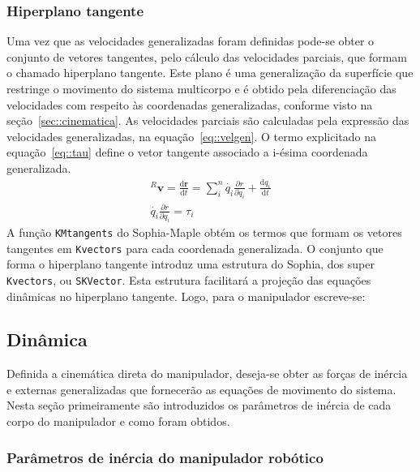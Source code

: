 \subsubsection{Hiperplano tangente}

Uma vez que as velocidades generalizadas foram definidas pode-se obter o
conjunto de vetores tangentes, pelo cálculo das velocidades parciais, que formam
o chamado hiperplano tangente.
Este plano é uma generalização da superfície que restringe o movimento do
sistema multicorpo e é obtido pela diferenciação das velocidades com respeito
às coordenadas generalizadas, conforme visto na seção~\ref{sec::cinematica}. As
velocidades parciais são calculadas pela expressão das velocidades
generalizadas, na equação~\ref{eq::velgen}. O termo explicitado na
equação~\ref{eq::tau} define o vetor tangente associado a i-ésima coordenada
generalizada.
%
\begin{gather}
	^{R}\mathbf{v} = \frac{\mathrm{d} \mathbf{r}}{\mathrm{d} t} = \sum_{i}^{n}
	\dot{q_{i}} \frac{\partial r}{\partial q_{i}} + \frac{\mathrm{d}
	q_{i}}{\mathrm{d} t} \label{eq::velgen}\\
	\dot{q_{i}} \frac{\partial r}{\partial q_{i}} = \tau_{i} \label{eq::tau}
\end{gather}
%
A função \texttt{KMtangents} do Sophia-Maple obtém os termos que formam os
vetores tangentes em \texttt{Kvectors} para cada coordenada generalizada. O
conjunto que forma o hiperplano tangente introduz uma estrutura do Sophia, dos
super \texttt{Kvectors}, ou \texttt{SKVector}. Esta estrutura facilitará a
projeção das equações dinâmicas no hiperplano tangente. Logo, para o manipulador
escreve-se:

\medskip {} \medskip 


\subsection{Dinâmica}

Definida a cinemática direta do manipulador, deseja-se obter as forças de
inércia e externas generalizadas que fornecerão as equações de movimento do
sistema. Nesta seção primeiramente são introduzidos os parâmetros de inércia de
cada corpo do manipulador e como foram obtidos.

\subsubsection{Parâmetros de inércia do manipulador robótico}

